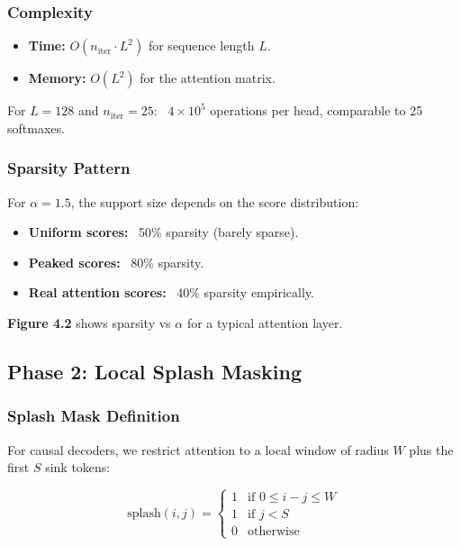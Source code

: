 \subsubsection{Complexity}

\begin{itemize}
\item \textbf{Time:} $O(n_\text{iter} \cdot L^2)$ for sequence length $L$.
\item \textbf{Memory:} $O(L^2)$ for the attention matrix.

\end{itemize}
For $L = 128$ and $n_\text{iter} = 25$: ~$4 \times 10^5$ operations per head, 
comparable to 25 softmaxes.

\subsubsection{Sparsity Pattern}

For $\alpha = 1.5$, the support size depends on the score distribution:

\begin{itemize}
\item \textbf{Uniform scores:} ~50\% sparsity (barely sparse).
\item \textbf{Peaked scores:} ~80\% sparsity.
\item \textbf{Real attention scores:} ~40\% sparsity empirically.

\end{itemize}
\textbf{Figure 4.2} shows sparsity vs $\alpha$ for a typical attention layer.

\subsection{Phase 2: Local Splash Masking}

\subsubsection{Splash Mask Definition}

For causal decoders, we restrict attention to a local window of radius $W$ 
plus the first $S$ sink tokens:

\[
\text{splash}(i, j) = \begin{cases}
1 & \text{if } 0 \leq i - j \leq W \\
1 & \text{if } j < S \\
0 & \text{otherwise}
\end{cases}
\tag{4.2}
\]

